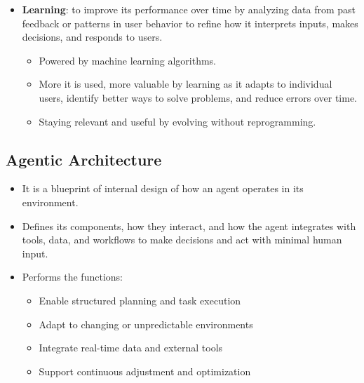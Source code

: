 \documentclass[12pt, letterpaper]{article}
\begin{document}
\begin{itemize}
        \begin{itemize}
            \item It uses logic-based rules, probabilistic models, or machine learning to analyze situations and make decisions.
            \item Reasons through the problems as it reduce constant human help and helps the agent adapt its responses in different situations.
            \item Making it more reliable and capable of handling complex inputs and changing user needs.
        \end{itemize}
    \item \textbf{Learning}: to improve its performance over time by analyzing data from past feedback or patterns in user behavior to refine how it interprets inputs, makes decisions, and responds to users.
        \begin{itemize}
            \item Powered by machine learning algorithms.
            \item More it is used, more valuable by learning as it adapts to individual users, identify better ways to solve problems, and reduce errors over time.
            \item Staying relevant and useful by evolving without reprogramming.
        \end{itemize}
\end{itemize}

\subsection{Agentic Architecture}
\begin{itemize}
    \item It is a blueprint of internal design of how an agent operates in its environment.
    \item Defines its components, how they interact, and how the agent integrates with tools, data, and workflows to make decisions and act with minimal human input.
    \item Performs the functions:
        \begin{itemize}
            \item Enable structured planning and task execution
            \item Adapt to changing or unpredictable environments
            \item Integrate real-time data and external tools
            \item Support continuous adjustment and optimization
        \end{itemize}
\end{itemize}
\end{document}
